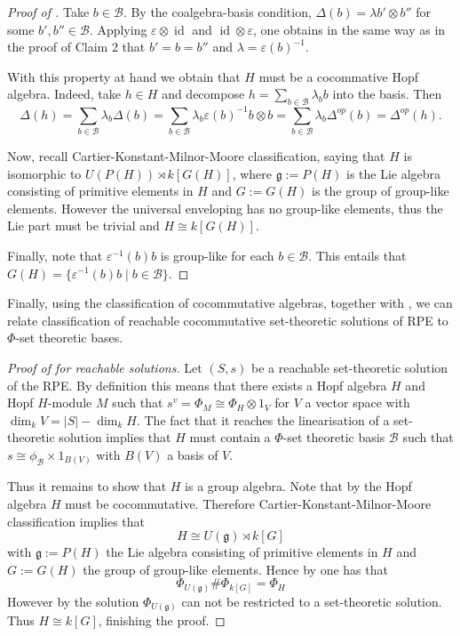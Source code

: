 \documentclass[a4paper,10pt]{amsart}
\theoremstyle{definition}
\theoremstyle{remark}
\DeclareMathOperator{\id}{id}
\newcommand\D{\Delta}
\newcommand\eps{\varepsilon}
\newcommand\ot{\otimes}
\newcommand\mc{\mathcal}
\begin{document}
\begin{proof}[Proof of ]
Take $b\in \mc{B}$. By the coalgebra-basis condition, $\D(b)=\lambda b'\otimes b''$ for some $b',b''\in \mc{B}$. Applying $\eps\otimes \id$ and $\id\ot \eps$, one obtains in the same way as in the proof of Claim 2 that $b' = b = b''$ and $\lambda = \eps(b)^{-1}$.


With this property at hand we obtain that $H$ must be a cocommative Hopf algebra. Indeed, take $h \in H$ and decompose $h = \sum_{b \in \mc{B}} \lambda_b b$ into the basis. Then 
$$\D (h) = \sum_{b \in \mc{B}} \lambda_b \D(b) = \sum_{b \in \mc{B}} \lambda_b \eps(b)^{-1} b\ot b = \sum_{b \in \mc{B}} \lambda_b \D^{op}(b) =\D^{op}(h).$$

Now, recall Cartier-Konstant-Milnor-Moore classification, saying that $H$ is isomorphic to $U(P(H)) \rtimes k[G(H)]$, where $\mathfrak{g} := P(H)$ is the Lie algebra consisting of primitive elements in $H$ and $G := G(H)$ is the group of group-like elements. However the universal enveloping has no group-like elements, thus the Lie part must be trivial and $H \cong k[G(H)].$

Finally, note that $\eps^{-1}(b)b$ is group-like for each $b \in \mc{B}$. This entails that $G(H) = \{ \eps^{-1}(b)b \mid b \in \mc{B} \}$.
\end{proof}

Finally, using the classification of cocommutative algebras, together with , we can relate classification of reachable cocommutative set-theoretic solutions of RPE to $\Phi$-set theoretic bases.


\begin{proof}[Proof of  for reachable solutions]
Let $(S,s)$ be a reachable set-theoretic solution of the RPE. By definition this means that there exists a Hopf algebra $H$ and Hopf $H$-module $M$ such that $s^v = \Phi_M \cong \Phi_H \ot 1_V$ for $V$ a vector space with $\dim_k V = |S| - \dim_k H$. The fact that it reaches the linearisation of a set-theoretic solution implies that $H$ must contain a $\Phi$-set theoretic basis $\mc{B}$ such that $s \cong \phi_{\mc{B}} \times 1_{B(V)}$ with $B(V)$ a basis of $V$.

Thus it remains to show that $H$ is a group algebra. Note that by  the Hopf algebra $H$ must be cocommutative. Therefore Cartier-Konstant-Milnor-Moore classification implies that 
$$H \cong U(\mathfrak{g}) \rtimes k[G]$$
with $\mathfrak{g} := P(H)$ the Lie algebra consisting of primitive elements in $H$ and $G := G(H)$ the group of group-like elements. Hence by  one has that
\begin{equation}\label{sol cocomm decomp}
\Phi_{U(\mathfrak{g})} \# \Phi_{k[G]} = \Phi_{H}
\end{equation}
However by  the solution $\Phi_{U(\mathfrak{g})}$ can not be restricted to a set-theoretic solution. Thus $H \cong k[G]$, finishing the proof.
\end{proof}
\end{document}
